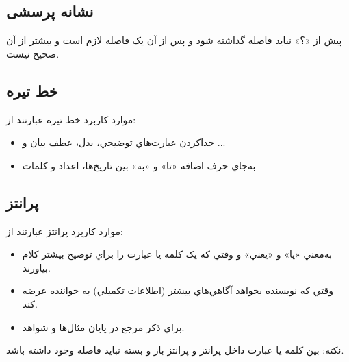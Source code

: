 \subsection{نشانه پرسشی}
پیش از «؟» نبايد فاصله گذاشته شود و پس از آن يک فاصله لازم است و بيشتر از آن صحیح نیست.
\subsection{خط تیره}
موارد کاربرد خط تیره عبارتند از:
\begin{itemize}
\item
جدا‌کردن عبارت‌هاي توضيحي، بدل، عطف بيان و ...
\item
به‌جاي حرف اضافه «تا» و «به» بين تاريخ‌ها، اعداد و کلمات
\end{itemize}
\subsection{پرانتز}
موارد کاربرد پرانتز عبارتند از:
\begin{itemize}
\item
به‌معني «يا» و «يعني» و وقتي که یک کلمه يا عبارت را براي توضيح بيشتر کلام بياورند.
\item
وقتي که نويسنده بخواهد آگاهي‌هاي بيشتر (اطلاعات تکميلي) به خواننده عرضه کند.
\item
براي ذکر مرجع در پايان مثال‌ها و شواهد.
\end{itemize}
نکته: بین کلمه یا عبارت داخل پرانتز و پرانتز باز و بسته نباید فاصله وجود داشته باشد.

